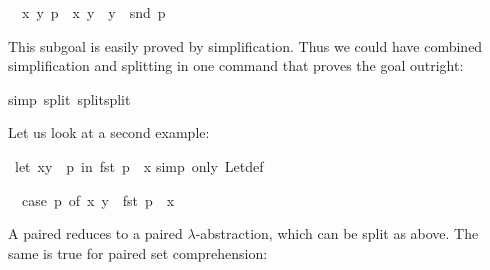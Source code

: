 \begin{isabellebody}
\begin{isamarkuptxt}
\begin{isabelle}
\ {}{}\ {}x\ y{}\ p\ {}\ {}x{}\ y{}\ {}\ y\ {}\ snd\ p%
\end{isabelle}
This subgoal is easily proved by simplification. Thus we could have combined
simplification and splitting in one command that proves the goal outright:%
\end{isamarkuptxt}%
\isamarkuptrue%
%
\endisatagproof
{\isafoldproof}%
%
\isadelimproof
%
\endisadelimproof
%
\isadelimproof
%
\endisadelimproof
%
\isatagproof
{}\isamarkupfalse%
{}simp\ split{}\ split{}split{}%
\endisatagproof
{\isafoldproof}%
%
\isadelimproof
%
\endisadelimproof
%
\begin{isamarkuptext}%
Let us look at a second example:%
\end{isamarkuptext}%
\isamarkuptrue%
\isamarkupfalse%
\ {}let\ {}x{}y{}\ {}\ p\ in\ fst\ p\ {}\ x{}\isanewline
%
\isadelimproof
%
\endisadelimproof
%
\isatagproof
{}\isamarkupfalse%
{}simp\ only{}\ Let{}def{}%
\begin{isamarkuptxt}%
\begin{isabelle}%
\ {}{}\ case\ p\ of\ {}x{}\ y{}\ {}\ fst\ p\ {}\ x%
\end{isabelle}
A paired  reduces to a paired $\lambda$-abstraction, which
can be split as above. The same is true for paired set comprehension:%
\end{isamarkuptxt}%
\isamarkuptrue%
%
\endisatagproof
{\isafoldproof}%
%
\isadelimproof
%
\endisadelimproof
{}\isamarkupfalse%

\end{isabellebody}
